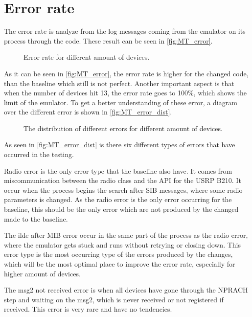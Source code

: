 \section{Error rate}
\label{sec:MTerror}
The error rate is analyze from the log messages coming from the emulator on its process through the code. These result can be seen in \autoref{fig:MT_error}.

\begin{figure}[H]
\centering
\resizebox{0.5\textwidth}{!}{
}
\caption{Error rate for different amount of devices.}
\label{fig:MT_error}
\end{figure}

As it can be seen in \autoref{fig:MT_error}, the error rate is higher for the changed code, than the baseline which still is not perfect. Another important aspect is that when the number of devices hit 13, the error rate goes to 100\%, which shows the limit of the emulator. To get a better understanding of these error, a diagram over the different error is shown in \autoref{fig:MT_error_dist}.

\begin{figure}[H]
\centering
\resizebox{0.8\textwidth}{!}{
}
\caption{The distribution of different errors for different amount of devices.}
\label{fig:MT_error_dist}
\end{figure}

As seen in \autoref{fig:MT_error_dist} is there six different types of errors that have occurred in the testing.

Radio error is the only error type that the baseline also have. It comes from miscommunication between the radio class and the API for the USRP B210. It occur when the process begins the search after SIB messages, where some radio parameters is changed. As the radio error is the only error occurring for the baseline, this should be the only error which are not produced by the changed made to the baseline.

The ilde after MIB error occur in the same part of the process as the radio error, where the emulator gets stuck and runs without retrying or closing down. This error type is the most occurring type of the errors produced by the changes, which will be the most optimal place to improve the error rate, especially for higher amount of devices.

The msg2 not received error is when all devices have gone through the NPRACH step and waiting on the msg2, which is never received or not registered if received. This error is very rare and have no tendencies.


